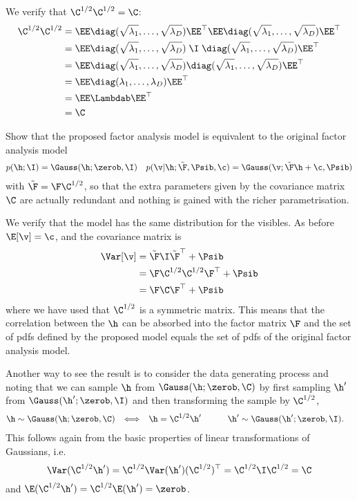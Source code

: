 \begin{exenumerate}
  \begin{solution}
    We verify that $\C^{1/2}\C^{1/2} = \C$:
    \begin{align}
      \C^{1/2} \C^{1/2} & = \EE \diag(\sqrt{\lambda_1}, \ldots, \sqrt{\lambda_D})\EE^\top \EE \diag(\sqrt{\lambda_1}, \ldots, \sqrt{\lambda_D})\EE^\top\\
      & = \EE \diag(\sqrt{\lambda_1}, \ldots, \sqrt{\lambda_D}) \; \I \; \diag(\sqrt{\lambda_1}, \ldots, \sqrt{\lambda_D})\EE^\top\\
     &= \EE \diag(\sqrt{\lambda_1}, \ldots, \sqrt{\lambda_D}) \diag(\sqrt{\lambda_1}, \ldots, \sqrt{\lambda_D})\EE^\top\\
      &= \EE \diag(\lambda_1, \ldots, \lambda_D) \EE^\top\\
      &= \EE \Lambdab \EE^\top\\
      & =\C
    \end{align}
    
  \end{solution}

\item Show that the proposed factor analysis model is equivalent to the original factor analysis model
  \begin{align}
    p(\h; \I) &= \Gauss(\h; \zerob, \I) & p(\v | \h; \tilde{\F}, \Psib, \c) = \Gauss(\v; \tilde{\F} \h+\c, \Psib)
  \end{align}
with $\tilde{\F} = \F \C^{1/2}$, so that the extra parameters given by
the covariance matrix $\C$ are actually redundant and nothing is gained with the richer parametrisation. 

\begin{solution}
  We verify that the model has the same distribution for the visibles. As before $\E[\v] = \c$, and the covariance matrix is
  \begin{align}
    \Var[\v] & = \tilde{\F} \I \tilde{\F}^\top + \Psib\\
    & =  \F \C^{1/2} \C^{1/2}  \F^\top + \Psib\\
    & =  \F \C  \F^\top + \Psib
  \end{align}
  where we have used that $\C^{1/2}$ is a symmetric matrix. This means
  that the correlation between the $\h$ can be absorbed into the
  factor matrix $\F$ and the set of pdfs defined by the proposed model
  equals the set of pdfs of the original factor analysis model.

  Another way to see the result is to consider the data generating
  process and noting that we can sample $\h$ from $\Gauss(\h; \zerob, \C)$
  by first sampling $\h'$ from $\Gauss(\h'; \zerob, \I)$ and then transforming the sample by $\C^{1/2}$,
  \begin{align}
    \h &\sim \Gauss(\h; \zerob, \C)  & \Longleftrightarrow && \h &= \C^{1/2} \h' \quad \quad \quad \h' \sim \Gauss(\h'; \zerob, \I).
  \end{align}
  This follows again from the basic properties of linear transformations of Gaussians, i.e.
  $$ \Var(\C^{1/2} \h') = \C^{1/2}\Var(\h')(\C^{1/2})^\top =  \C^{1/2}\I \C^{1/2} =  \C$$
  and $\E(\C^{1/2} \h') = \C^{1/2} \E(\h') = \zerob$.


\end{solution}
\end{exenumerate}
